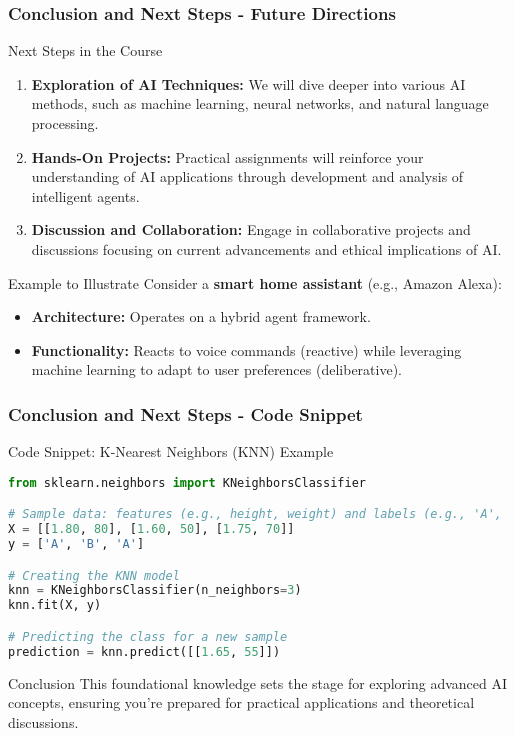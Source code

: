 \documentclass[aspectratio=169]{beamer}
\begin{document}
\begin{frame}[fragile]
    \frametitle{Conclusion and Next Steps - Future Directions}
    \begin{block}{Next Steps in the Course}
        \begin{enumerate}
            \item \textbf{Exploration of AI Techniques:} We will dive deeper into various AI methods, such as machine learning, neural networks, and natural language processing.
            \item \textbf{Hands-On Projects:} Practical assignments will reinforce your understanding of AI applications through development and analysis of intelligent agents.
            \item \textbf{Discussion and Collaboration:} Engage in collaborative projects and discussions focusing on current advancements and ethical implications of AI.
        \end{enumerate}
    \end{block}
    
    \begin{block}{Example to Illustrate}
        Consider a \textbf{smart home assistant} (e.g., Amazon Alexa):
        \begin{itemize}
            \item \textbf{Architecture:} Operates on a hybrid agent framework.
            \item \textbf{Functionality:} Reacts to voice commands (reactive) while leveraging machine learning to adapt to user preferences (deliberative).
        \end{itemize}
    \end{block}
\end{frame}

\begin{frame}[fragile]
    \frametitle{Conclusion and Next Steps - Code Snippet}
    \begin{block}{Code Snippet: K-Nearest Neighbors (KNN) Example}
        \begin{lstlisting}[language=Python]
from sklearn.neighbors import KNeighborsClassifier

# Sample data: features (e.g., height, weight) and labels (e.g., 'A', 'B')
X = [[1.80, 80], [1.60, 50], [1.75, 70]]
y = ['A', 'B', 'A']

# Creating the KNN model
knn = KNeighborsClassifier(n_neighbors=3)
knn.fit(X, y)

# Predicting the class for a new sample
prediction = knn.predict([[1.65, 55]])
        \end{lstlisting}
    \end{block}
    
    \begin{block}{Conclusion}
        This foundational knowledge sets the stage for exploring advanced AI concepts, ensuring you’re prepared for practical applications and theoretical discussions.
    \end{block}
\end{frame}
\end{document}
